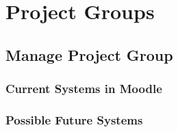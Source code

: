 \section{Project Groups}
\label{sec:projectgroups}


\subsection{Manage Project Group}
\subsubsection{Current Systems in Moodle}
\subsubsection{Possible Future Systems}





\begin{comment}
\todo{Undersøgelse af: "`Hvem skal oprette projektgrupperne"' }
\todo{Kom frem til at vi skal interview administrativt personale for at finde ud af hvordan grupper bliver brugt i praksis}
\subsection{Interviews}
\todo{Fortæl om følgende interviews
-Thomas Rybjerg
-Lene Even
-Jette og Pia
-Morten Andersen
-Mikael Møller} 
\end{comment}
